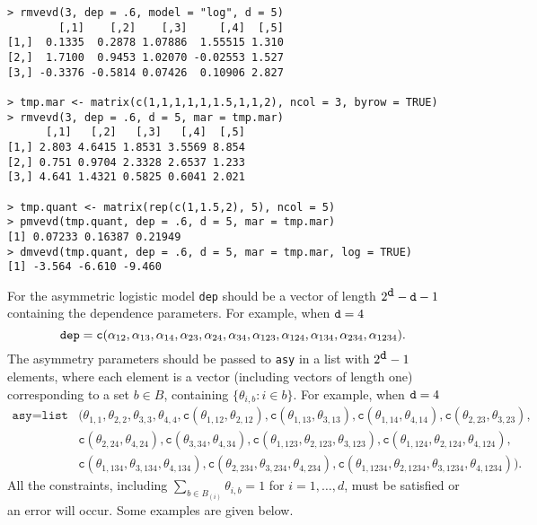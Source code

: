 \documentclass[11pt,a4paper]{article}
\begin{document}
\begin{verbatim}
> rmvevd(3, dep = .6, model = "log", d = 5)
        [,1]    [,2]    [,3]     [,4]  [,5]
[1,]  0.1335  0.2878 1.07886  1.55515 1.310
[2,]  1.7100  0.9453 1.02070 -0.02553 1.527
[3,] -0.3376 -0.5814 0.07426  0.10906 2.827

> tmp.mar <- matrix(c(1,1,1,1,1,1.5,1,1,2), ncol = 3, byrow = TRUE)
> rmvevd(3, dep = .6, d = 5, mar = tmp.mar)
      [,1]   [,2]   [,3]   [,4]  [,5]
[1,] 2.803 4.6415 1.8531 3.5569 8.854
[2,] 0.751 0.9704 2.3328 2.6537 1.233
[3,] 4.641 1.4321 0.5825 0.6041 2.021

> tmp.quant <- matrix(rep(c(1,1.5,2), 5), ncol = 5)
> pmvevd(tmp.quant, dep = .6, d = 5, mar = tmp.mar)
[1] 0.07233 0.16387 0.21949
> dmvevd(tmp.quant, dep = .6, d = 5, mar = tmp.mar, log = TRUE)
[1] -3.564 -6.610 -9.460
\end{verbatim}

For the asymmetric logistic model \verb+dep+ should be a vector of length $2^{\verb+d+}-\verb+d+-1$ containing the dependence parameters.
For example, when $\verb+d+ = 4$
\begin{equation*}
\verb+dep+ = \texttt{c}(\alpha_{12},\alpha_{13},\alpha_{14},\alpha_{23},\alpha_{24},\alpha_{34},\alpha_{123},\alpha_{124},\alpha_{134},\alpha_{234},\alpha_{1234}).
\end{equation*}
The asymmetry parameters should be passed to \verb+asy+ in a list with $2^{\verb+d+}-1$ elements, where each element is a vector (including vectors of length one) corresponding to a set $b \in B$, containing $\{\theta_{i,b}:i \in b\}$.
For example, when $\verb+d+ = 4$
\begin{align*}
\texttt{asy} = \texttt{list}&(\theta_{1,1}, \theta_{2,2}, \theta_{3,3}, \theta_{4,4}, \texttt{c}(\theta_{1,12},\theta_{2,12}), \texttt{c}(\theta_{1,13},\theta_{3,13}), \texttt{c}(\theta_{1,14},\theta_{4,14}), \texttt{c}(\theta_{2,23},\theta_{3,23}), \\
&\texttt{c}(\theta_{2,24},\theta_{4,24}), \texttt{c}(\theta_{3,34},\theta_{4,34}), \texttt{c}(\theta_{1,123},\theta_{2,123},\theta_{3,123}), \texttt{c}(\theta_{1,124},\theta_{2,124},\theta_{4,124}), \\
&\texttt{c}(\theta_{1,134},\theta_{3,134},\theta_{4,134}), \texttt{c}(\theta_{2,234},\theta_{3,234},\theta_{4,234}), \texttt{c}(\theta_{1,1234},\theta_{2,1234},\theta_{3,1234},\theta_{4,1234})).
\end{align*}
All the constraints, including  $\sum_{b \in B_{(i)}}\theta_{i,b}=1$ for $i=1,\dots,d$, must be satisfied or an error will occur.
Some examples are given below.
\end{document}
